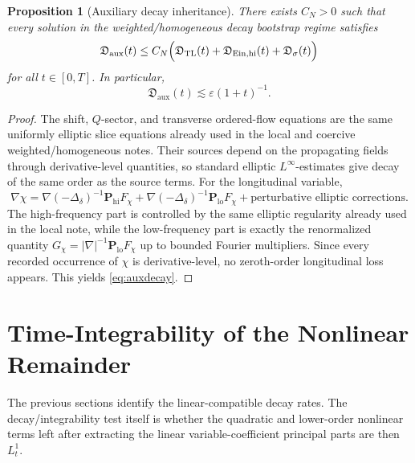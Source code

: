 \documentclass[11pt]{article}
\newtheorem{proposition}{Proposition}
\begin{document}
\begin{proposition}[Auxiliary decay inheritance]
\label{prop:auxdecay}
There exists \(C_N>0\) such that every solution in the weighted/homogeneous decay bootstrap regime satisfies
\begin{equation}
\mathfrak D_{\mathrm{aux}}(t)
\le
C_N\Bigl(
\mathfrak D_{\mathrm{TL}}(t)
+ \mathfrak D_{\mathrm{Ein,hi}}(t)
+ \mathfrak D_\sigma(t)
\Bigr)
\label{eq:auxdecay}
\end{equation}
for all \(t\in[0,T]\). In particular,
\begin{equation}
\mathfrak D_{\mathrm{aux}}(t)\lesssim \varepsilon(1+t)^{-1}.
\label{eq:auxrate}
\end{equation}
\end{proposition}

\begin{proof}
The shift, \(Q\)-sector, and transverse ordered-flow equations are the same uniformly elliptic slice equations already used in the local and coercive weighted/homogeneous notes. Their sources depend on the propagating fields through derivative-level quantities, so standard elliptic \(L^\infty\)-estimates give decay of the same order as the source terms. For the longitudinal variable,
\[
\nabla\chi
=
\nabla(-\Delta_\delta)^{-1}\mathbf P_{\mathrm{hi}}F_\chi
+ \nabla(-\Delta_\delta)^{-1}\mathbf P_{\mathrm{lo}}F_\chi
+ \text{perturbative elliptic corrections}.
\]
The high-frequency part is controlled by the same elliptic regularity already used in the local note, while the low-frequency part is exactly the renormalized quantity \(G_\chi=|\nabla|^{-1}\mathbf P_{\mathrm{lo}}F_\chi\) up to bounded Fourier multipliers. Since every recorded occurrence of \(\chi\) is derivative-level, no zeroth-order longitudinal loss appears. This yields \eqref{eq:auxdecay}.
\end{proof}

\section{Time-Integrability of the Nonlinear Remainder}

The previous sections identify the linear-compatible decay rates. The decay/integrability test itself is whether the quadratic and lower-order nonlinear terms left after extracting the linear variable-coefficient principal parts are then \(L_t^1\).
\end{document}
